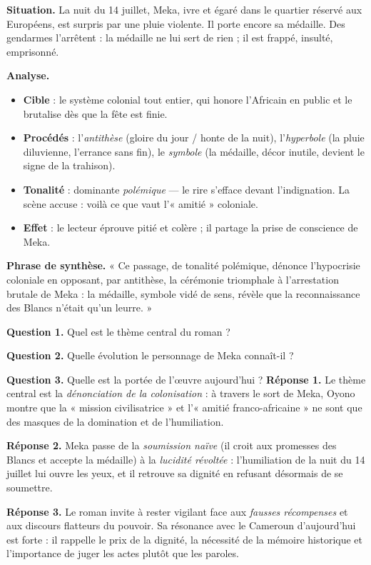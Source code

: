 \documentclass[11pt]{article}
\newcounter{popsec}
\newcounter{popsub}
\newcommand{\courssub}[1]{%
  \stepcounter{popsub}%
  \par\vspace{9pt}\noindent{\popxbold\fontsize{11.5}{13}\selectfont\color{popink}{\color{poporange}\thepopsec.\thepopsub}\hspace{6pt}#1}\par\nopagebreak\vspace{4pt}
}
\begin{document}
\begin{exemplebox}
\textbf{Situation.} La nuit du 14 juillet, Meka, ivre et égaré dans le quartier réservé aux Européens, est surpris par une pluie violente. Il porte encore sa médaille. Des gendarmes l'arrêtent : la médaille ne lui sert de rien ; il est frappé, insulté, emprisonné.

\textbf{Analyse.}
\begin{itemize}
\item \textbf{Cible} : le système colonial tout entier, qui honore l'Africain en public et le brutalise dès que la fête est finie.
\item \textbf{Procédés} : l'\emph{antithèse} (gloire du jour / honte de la nuit), l'\emph{hyperbole} (la pluie diluvienne, l'errance sans fin), le \emph{symbole} (la médaille, décor inutile, devient le signe de la trahison).
\item \textbf{Tonalité} : dominante \emph{polémique} — le rire s'efface devant l'indignation. La scène accuse : voilà ce que vaut l'« amitié » coloniale.
\item \textbf{Effet} : le lecteur éprouve pitié et colère ; il partage la prise de conscience de Meka.
\end{itemize}
\textbf{Phrase de synthèse.} « Ce passage, de tonalité polémique, dénonce l'hypocrisie coloniale en opposant, par antithèse, la cérémonie triomphale à l'arrestation brutale de Meka : la médaille, symbole vidé de sens, révèle que la reconnaissance des Blancs n'était qu'un leurre. »
\end{exemplebox}

\courssub{Évaluation et bilan de l'étude de l'œuvre}

\begin{exoresolu}
\textbf{Question 1.} Quel est le thème central du roman ?

\textbf{Question 2.} Quelle évolution le personnage de Meka connaît-il ?

\textbf{Question 3.} Quelle est la portée de l'œuvre aujourd'hui ?
\tcblower
\textbf{Réponse 1.} Le thème central est la \emph{dénonciation de la colonisation} : à travers le sort de Meka, Oyono montre que la « mission civilisatrice » et l'« amitié franco-africaine » ne sont que des masques de la domination et de l'humiliation.

\textbf{Réponse 2.} Meka passe de la \emph{soumission naïve} (il croit aux promesses des Blancs et accepte la médaille) à la \emph{lucidité révoltée} : l'humiliation de la nuit du 14 juillet lui ouvre les yeux, et il retrouve sa dignité en refusant désormais de se soumettre.

\textbf{Réponse 3.} Le roman invite à rester vigilant face aux \emph{fausses récompenses} et aux discours flatteurs du pouvoir. Sa résonance avec le Cameroun d'aujourd'hui est forte : il rappelle le prix de la dignité, la nécessité de la mémoire historique et l'importance de juger les actes plutôt que les paroles.
\end{exoresolu}
\end{document}
